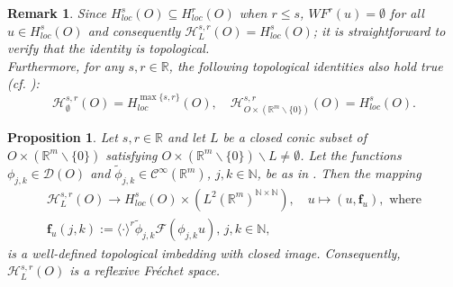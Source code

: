\documentclass{amsart}
\newtheorem{proposition}[theorem]{Proposition}
\newtheorem{remark}{Remark}[section]
\theoremstyle{definition}
\begin{document}
\begin{remark}
\label{Odnos_indeksa}
Since $H_{loc} ^s (O) \subseteq H_{loc} ^r (O)$ when $r\leq s$, $WF^{r} (u) = \emptyset$ for all $u\in H_{loc} ^s (O)$ and consequently $\mathscr{H}_L ^{s,r} (O)=H_{loc} ^s (O)$; it is straightforward to verify that the identity is topological.\\
\indent Furthermore, for any $s,r\in\mathbb{R}$, the following topological identities also hold true (cf. \cite[Remark 3.6]{PP}):
$$
\mathscr{H}_{\emptyset}^{s,r} (O)=H_{loc}^{\max\{s,r\}} (O),\quad \mathscr{H}_{O\times(\mathbb{R}^m\backslash\{0\})}^{s,r} (O)=H_{loc}^s(O).
$$
\end{remark}

\begin{proposition}
\label{Frese}
Let $s,r\in\mathbb{R}$ and let $L$ be a closed conic subset of $O\times(\mathbb{R}^m\backslash\{0\})$ satisfying $O\times(\mathbb{R}^m\backslash\{0\})\backslash L\neq \emptyset$.
Let the functions $\phi_{j,k}\in\mathcal{D}(O)$ and $\widetilde{\phi}_{j,k}\in\mathcal{C}^{\infty}(\mathbb{R}^m)$, $j,k\in\mathbb{N}$, be as in \cite[Proposition 3.7]{PP}. Then the mapping
\begin{align}
\mathscr{H}^{s,r}_L(O)\rightarrow H^s_{loc}(O)\times (L^2(\mathbb{R}^m)^{\mathbb{N}\times \mathbb{N}}),\quad u\mapsto(u,\mathbf{f}_u),\,\, \mbox{where}\label{equ-for-map}\\
\mathbf{f}_u(j,k):=\langle\cdot\rangle^r \widetilde{\phi}_{j,k}\mathcal{F}(\phi_{j,k} u),\, j,k\in\mathbb{N},\nonumber
\end{align}
is a well-defined topological imbedding with closed image. Consequently, $\mathscr{H}^{s,r}_L(O)$ is a reflexive Fr\'echet space.
\end{proposition}
\end{document}
